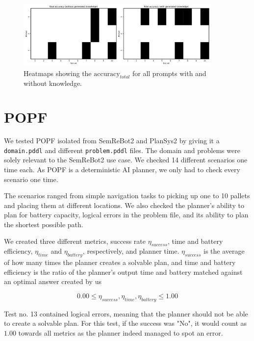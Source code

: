 \begin{figure}[h]
    \centering  
    \includegraphics[width=0.9\textwidth]{figures/specific_heatmaps.pdf}
    \caption[Specific PDDL domain $\text{total}_{accuracy}$]{Heatmaps showing the $\text{accuracy}_{total}$ for all prompts with and without knowledge.}
    \label{fig:specific_heatmap}
\end{figure}

\section{POPF}\label{sec:POPF_experiments}
We tested POPF isolated from SemReBot2 and PlanSys2 by giving it a \verb|domain.pddl| and different
\verb|problem.pddl| files. The domain and problems were solely relevant to the SemReBot2 use case. We
checked 14 different scenarios one time each. As POPF is a deterministic AI planner, we only had to
check every scenario one time.

The scenarios ranged from simple navigation tasks to picking up one to 10 pallets and placing
them at different locations. We also checked the planner's ability to plan for battery capacity,
logical errors in the problem file, and its ability to plan the shortest possible path.

We created three different metrics, success rate $\eta_{success}$, time and battery efficiency, $\eta_{time}$ and $\eta_{battery}$, respectively, and planner time. $\eta_{success}$ is the average of how many times the planner creates a solvable plan, and time and battery efficiency is the ratio of the planner's output time and battery matched against an optimal answer created by us

\begin{equation}\label{eq:popf_metrics}
    0.00 \leq \eta_{success}, \eta_{time}, \eta_{battery} \leq 1.00
\end{equation}

Test no. 13 contained logical errors, meaning that the planner should not be able to create a solvable plan. For this test, if the success was "No", it would count as $1.00$ towards all metrics as the planner indeed managed to spot an error.

